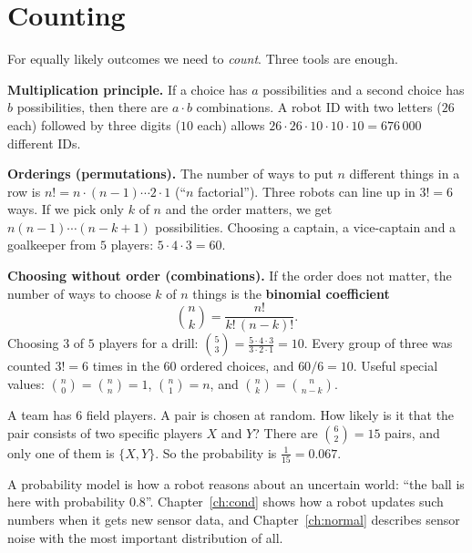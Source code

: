 \section*{Counting}
For equally likely outcomes we need to \emph{count}. Three tools are enough.

\textbf{Multiplication principle.} If a choice has $a$ possibilities and a second choice has $b$ possibilities, then there are $a\cdot b$ combinations. A robot ID with two letters ($26$ each) followed by three digits ($10$ each) allows $26\cdot26\cdot10\cdot10\cdot10=676\,000$ different IDs.

\textbf{Orderings (permutations).} The number of ways to put $n$ different things in a row is $n!=n\cdot(n-1)\cdots2\cdot1$ (``$n$ factorial''). Three robots can line up in $3!=6$ ways. If we pick only $k$ of $n$ and the order matters, we get $n(n-1)\cdots(n-k+1)$ possibilities. Choosing a captain, a vice-captain and a goalkeeper from $5$ players: $5\cdot4\cdot3=60$.

\textbf{Choosing without order (combinations).} If the order does not matter, the number of ways to choose $k$ of $n$ things is the \textbf{binomial coefficient}
\[
\binom{n}{k}=\frac{n!}{k!\,(n-k)!}.
\]
Choosing $3$ of $5$ players for a drill: $\binom53=\frac{5\cdot4\cdot3}{3\cdot2\cdot1}=10$. Every group of three was counted $3!=6$ times in the $60$ ordered choices, and $60/6=10$. Useful special values: $\binom n0=\binom nn=1$, $\binom n1=n$, and $\binom nk=\binom n{n-k}$.

\begin{example}
A team has $6$ field players. A pair is chosen at random. How likely is it that the pair consists of two specific players $X$ and $Y$? There are $\binom62=15$ pairs, and only one of them is $\{X,Y\}$. So the probability is $\frac1{15}=0.067$.
\end{example}

\begin{aibox}
A probability model is how a robot reasons about an uncertain world: ``the ball is here with probability $0.8$''. Chapter~\ref{ch:cond} shows how a robot updates such numbers when it gets new sensor data, and Chapter~\ref{ch:normal} describes sensor noise with the most important distribution of all.
\end{aibox}

